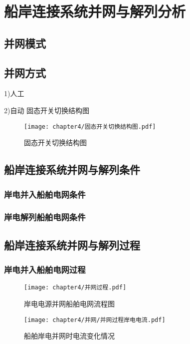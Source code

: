 \chapter{船岸连接系统并网与解列分析}

\section{并网模式}

\section{并网方式}
1)人工

2)自动
固态开关切换结构图
\begin{figure}[!htp]
	\centering
	\texttt{[image: chapter4/固态开关切换结构图.pdf]}
	\caption{固态开关切换结构图}
	\label{fig:固态开关切换结构图}
\end{figure}

\section{船岸连接系统并网与解列条件}

\subsection{岸电并入船舶电网条件}

\subsection{岸电解列船舶电网条件}

\section{船岸连接系统并网与解列过程}

\subsection{岸电并入船舶电网过程}


\begin{figure}[!htp]
	\centering
	\texttt{[image: chapter4/并网过程.pdf]}
	\caption{岸电电源并网船舶电网流程图}
	\label{fig:岸电电源并网船舶电网流程图}
\end{figure}


\begin{figure}[!htp]
	\centering
	\texttt{[image: chapter4/并网/并网过程岸电电流.pdf]}
	\caption{船舶岸电并网时电流变化情况}
	\label{fig:船舶岸电并网时电流变化情况}
\end{figure}

